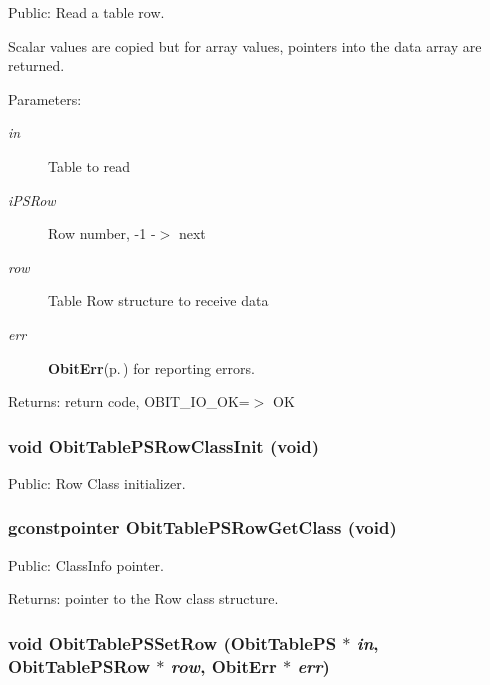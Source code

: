 Public: Read a table row. 

Scalar values are copied but for array values, pointers into the data array are returned. \begin{Desc}
\item[Parameters:]
\begin{description}
\item[{\em in}]Table to read \item[{\em i\-PSRow}]Row number, -1 -$>$ next \item[{\em row}]Table Row structure to receive data \item[{\em err}]{\bf Obit\-Err}{\rm (p.\,\pageref{structObitErr})} for reporting errors. \end{description}
\end{Desc}
\begin{Desc}
\item[Returns:]return code, OBIT\_\-IO\_\-OK=$>$ OK \end{Desc}
\subsubsection{\setlength{\rightskip}{0pt plus 5cm}void Obit\-Table\-PSRow\-Class\-Init (void)}\label{ObitTablePS_8h_a7}


Public: Row Class initializer. 

\subsubsection{\setlength{\rightskip}{0pt plus 5cm}gconstpointer Obit\-Table\-PSRow\-Get\-Class (void)}\label{ObitTablePS_8h_a9}


Public: Class\-Info pointer. 

\begin{Desc}
\item[Returns:]pointer to the Row class structure. \end{Desc}
\subsubsection{\setlength{\rightskip}{0pt plus 5cm}void Obit\-Table\-PSSet\-Row ({\bf Obit\-Table\-PS} $\ast$ {\em in}, {\bf Obit\-Table\-PSRow} $\ast$ {\em row}, {\bf Obit\-Err} $\ast$ {\em err})}\label{ObitTablePS_8h_a19}


